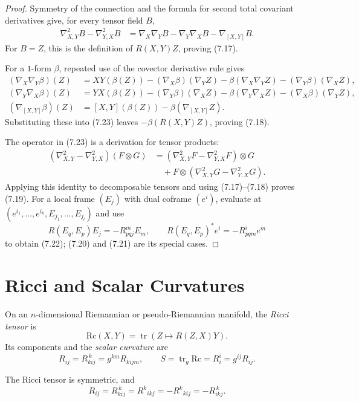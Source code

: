 \begin{proof}
\sketch Symmetry of the connection and the formula for second total
covariant derivatives give, for every tensor field $B$,
\begin{align}
\nabla^2_{X,Y}B-\nabla^2_{Y,X}B
&=\nabla_X\nabla_YB-\nabla_Y\nabla_XB-\nabla_{[X,Y]}B.
\tag{7.23}
\end{align}
For $B=Z$, this is the definition of $R(X,Y)Z$, proving (7.17).

For a $1$-form $\beta$, repeated use of the covector derivative rule gives
\begin{align}
(\nabla_X\nabla_Y\beta)(Z)
&=XY(\beta(Z))-(\nabla_X\beta)(\nabla_YZ)
-\beta(\nabla_X\nabla_YZ)
-(\nabla_Y\beta)(\nabla_XZ),
\tag{7.24}\\
(\nabla_Y\nabla_X\beta)(Z)
&=YX(\beta(Z))-(\nabla_Y\beta)(\nabla_XZ)
-\beta(\nabla_Y\nabla_XZ)
-(\nabla_X\beta)(\nabla_YZ),
\tag{7.25}\\
(\nabla_{[X,Y]}\beta)(Z)
&=[X,Y](\beta(Z))-\beta(\nabla_{[X,Y]}Z).
\tag{7.26}
\end{align}
Substituting these into (7.23) leaves
$-\beta(R(X,Y)Z)$, proving (7.18).

The operator in (7.23) is a derivation for tensor products:
\begin{align*}
(\nabla^2_{X,Y}-\nabla^2_{Y,X})(F\otimes G)
&=(\nabla^2_{X,Y}F-\nabla^2_{Y,X}F)\otimes G\\
&\quad+F\otimes
(\nabla^2_{X,Y}G-\nabla^2_{Y,X}G).
\end{align*}
Applying this identity to decomposable tensors and using (7.17)--(7.18)
proves (7.19). For a local frame $(E_j)$ with dual coframe $(e^i)$, evaluate
at $(e^{i_1},\ldots,e^{i_k},E_{j_1},\ldots,E_{j_l})$ and use
\[
R(E_q,E_p)E_j=-R_{pqj}^mE_m,\qquad
R(E_q,E_p)^*e^i=-R_{pqm}^ie^m
\]
to obtain (7.22); (7.20) and (7.21) are its special cases.
\end{proof}

\section{Ricci and Scalar Curvatures}

On an $n$-dimensional Riemannian or pseudo-Riemannian manifold, the
\emph{Ricci tensor} is
\[
\mathrm{Rc}(X,Y)=\operatorname{tr}(Z\mapsto R(Z,X)Y).
\]
Its components and the \emph{scalar curvature} are
\[
R_{ij}=R_{kij}^{\,k}=g^{km}R_{kijm},
\qquad
S=\operatorname{tr}_g\mathrm{Rc}=R_i^i=g^{ij}R_{ij}.
\]

\begin{lemma}
\label{lem:ricci-symmetries}

The Ricci tensor is symmetric, and
\[
R_{ij}=R_{kij}^{\,k}=R^k{}_{ikj}
=-R^k{}_{kij}=-R_{ikj}^{\,k}.
\]
\end{lemma}

